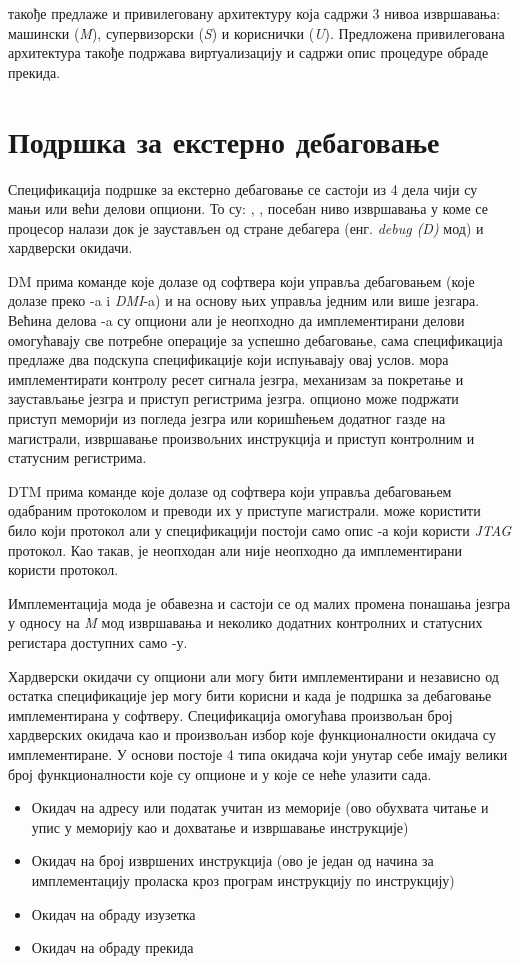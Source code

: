  такође предлаже и привилеговану архитектуру\cite{priv_spec} која садржи 3 нивоа извршавања: машински (\textit{M}), супервизорски (\textit{S}) и кориснички (\textit{U}).
Предложена привилегована архитектура такође подржава виртуализацију и садржи опис процедуре обраде прекида.

\section{Подршка за екстерно дебаговање}

Спецификација подршке за екстерно дебаговање\cite{debug_spec} се састоји из 4 дела чији су мањи или већи делови опциони.
То су: , , посебан ниво извршавања у коме се процесор налази док је заустављен од стране дебагера (енг. \textit{debug (D)} мод) и хардверски окидачи.

\acrfull{DM} прима команде које долазе од софтвера који управља дебаговањем (које долазе преко -a i \textit{\acrfull{DMI}}-a) и на основу њих управља једним или више језгара.
Већина делова -a су опциони али је неопходно да имплементирани делови омогућавају све потребне операције за успешно дебаговање, сама спецификација предлаже два подскупа спецификације који испуњавају овај услов.
 мора имплементирати контролу ресет сигнала језгра, механизам за покретање и заустављање језгра и приступ регистрима језгра.
 опционо може подржати приступ меморији из погледа језгра или коришћењем додатног газде на магистрали, извршавање произвољних инструкција и приступ контролним и статусним регистрима.

\acrfull{DTM} прима команде које долазе од софтвера који управља дебаговањем одабраним протоколом и преводи их у приступе  магистрали.
 може користити било који протокол али у спецификацији постоји само опис -а који користи \textit{\acrfull{JTAG}} протокол.
Као такав,  је неопходан али није неопходно да имплементирани  користи  протокол.

Имплементација  мода је обавезна и састоји се од малих промена понашања језгра у односу на \textit{M} мод извршавања и неколико додатних контролних и статусних регистара доступних само -у.

Хардверски окидачи су опциони али могу бити имплементирани и независно од остатка спецификације јер могу бити корисни и када је подршка за дебаговање имплементирана у софтверу.
Спецификација омогућава произвољан број хардверских окидача као и произвољан избор које функционалности окидача су имплементиране.
У основи постоје 4 типа окидача који унутар себе имају велики број функционалности које су опционе и у које се неће улазити сада.
\begin{itemize}
	\item Окидач на адресу или податак учитан из меморије (ово обухвата читање и упис у меморију као и дохватање и извршавање инструкције)
	\item Окидач на број извршених инструкција (ово је један од начина за имплементацију проласка кроз програм инструкцију по инструкцију)
	\item Окидач на обраду изузетка
	\item Окидач на обраду прекида
\end{itemize}

